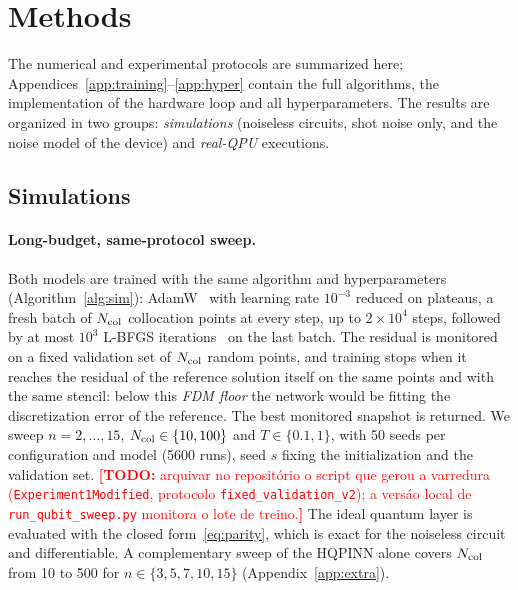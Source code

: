 \documentclass[floatfix,aps,pra,twocolumn,superscriptaddress,10pt,nofootinbib]{revtex4-2}
\newif\ifshowtodos \showtodostrue
\newcommand{\TODO}[1]{\ifshowtodos\textcolor{red}{\textbf{[TODO:} #1\textbf{]}}\fi}
\newcommand{\Ncol}{N_{\rm col}}
\newcounter{algorithm}
\begin{document}
\newpage

\section{Methods}\label{sec:methods}
The numerical and experimental protocols are summarized here; Appendices~\ref{app:training}--\ref{app:hyper} contain the full algorithms, the implementation of the hardware loop and all hyperparameters. The results are organized in two groups: \emph{simulations} (noiseless circuits, shot noise only, and the noise model of the device) and \emph{real-QPU} executions.

\subsection{Simulations}\label{sec:methods_sim}
\paragraph{Long-budget, same-protocol sweep.} Both models are trained with the same algorithm and hyperparameters (Algorithm~\ref{alg:sim}): AdamW~\cite{loshchilov2019decoupled} with learning rate $10^{-3}$ reduced on plateaus, a fresh batch of $\Ncol$ collocation points at every step, up to $2\times10^4$ steps, followed by at most $10^3$ L-BFGS iterations~\cite{liu1989limited} on the last batch. The residual is monitored on a fixed validation set of $\Ncol$ random points, and training stops when it reaches the residual of the reference solution itself on the same points and with the same stencil: below this \emph{FDM floor} the network would be fitting the discretization error of the reference. The best monitored snapshot is returned. We sweep $n=2,\dots,15$, $\Ncol\in\{10,100\}$ and $T\in\{0.1,1\}$, with 50 seeds per configuration and model (5600 runs), seed $s$ fixing the initialization and the validation set. \TODO{arquivar no reposit\'orio o script que gerou a varredura (\texttt{Experiment1Modified}, protocolo \texttt{fixed\_validation\_v2}); a vers\'ao local de \texttt{run\_qubit\_sweep.py} monitora o lote de treino.} The ideal quantum layer is evaluated with the closed form~\eqref{eq:parity}, which is exact for the noiseless circuit and differentiable. A complementary sweep of the HQPINN alone covers $\Ncol$ from 10 to 500 for $n\in\{3,5,7,10,15\}$ (Appendix~\ref{app:extra}).
\end{document}
